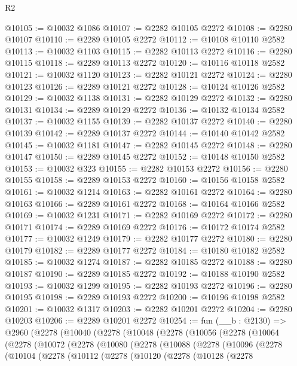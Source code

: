 \begin{lexlean}{R2}
\begin{coremodule}
@10105 := @10032 @1086
@10107 := @2282 @10105 @2272
@10108 := @2280 @10107
@10110 := @2289 @10105 @2272
@10112 := @10108 @10110 @2582
@10113 := @10032 @1103
@10115 := @2282 @10113 @2272
@10116 := @2280 @10115
@10118 := @2289 @10113 @2272
@10120 := @10116 @10118 @2582
@10121 := @10032 @1120
@10123 := @2282 @10121 @2272
@10124 := @2280 @10123
@10126 := @2289 @10121 @2272
@10128 := @10124 @10126 @2582
@10129 := @10032 @1138
@10131 := @2282 @10129 @2272
@10132 := @2280 @10131
@10134 := @2289 @10129 @2272
@10136 := @10132 @10134 @2582
@10137 := @10032 @1155
@10139 := @2282 @10137 @2272
@10140 := @2280 @10139
@10142 := @2289 @10137 @2272
@10144 := @10140 @10142 @2582
@10145 := @10032 @1181
@10147 := @2282 @10145 @2272
@10148 := @2280 @10147
@10150 := @2289 @10145 @2272
@10152 := @10148 @10150 @2582
@10153 := @10032 @323
@10155 := @2282 @10153 @2272
@10156 := @2280 @10155
@10158 := @2289 @10153 @2272
@10160 := @10156 @10158 @2582
@10161 := @10032 @1214
@10163 := @2282 @10161 @2272
@10164 := @2280 @10163
@10166 := @2289 @10161 @2272
@10168 := @10164 @10166 @2582
@10169 := @10032 @1231
@10171 := @2282 @10169 @2272
@10172 := @2280 @10171
@10174 := @2289 @10169 @2272
@10176 := @10172 @10174 @2582
@10177 := @10032 @1249
@10179 := @2282 @10177 @2272
@10180 := @2280 @10179
@10182 := @2289 @10177 @2272
@10184 := @10180 @10182 @2582
@10185 := @10032 @1274
@10187 := @2282 @10185 @2272
@10188 := @2280 @10187
@10190 := @2289 @10185 @2272
@10192 := @10188 @10190 @2582
@10193 := @10032 @1299
@10195 := @2282 @10193 @2272
@10196 := @2280 @10195
@10198 := @2289 @10193 @2272
@10200 := @10196 @10198 @2582
@10201 := @10032 @1317
@10203 := @2282 @10201 @2272
@10204 := @2280 @10203
@10206 := @2289 @10201 @2272
@10254 := fun (__b : @2130) =>
  @2960
    (@2278
      (@10040
        (@2278
          (@10048
            (@2278
              (@10056
                (@2278
                  (@10064
                    (@2278
                      (@10072
                        (@2278
                          (@10080
                            (@2278
                              (@10088
                                (@2278
                                  (@10096
                                    (@2278
                                      (@10104
                                        (@2278
                                          (@10112
                                            (@2278
                                              (@10120
                                                (@2278
                                                  (@10128
                                                    (@2278

\end{coremodule}
\end{lexlean}
